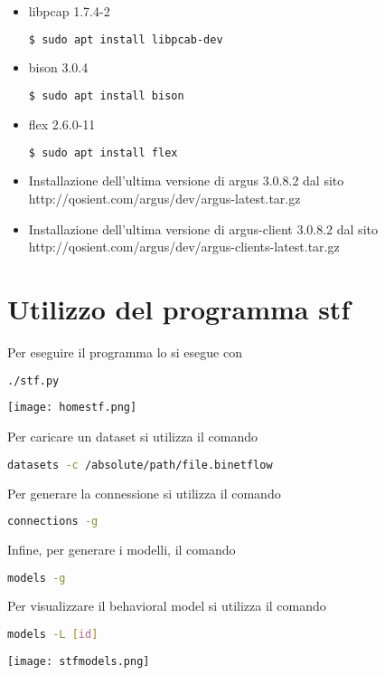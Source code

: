 \documentclass[../main.tex]{subfiles}
\begin{document}
\begin{itemize}
				\item libpcap 1.7.4-2
\begin{lstlisting}[language=bash]
$ sudo apt install libpcab-dev
\end{lstlisting}

\item bison 3.0.4
\begin{lstlisting}[language=bash]
$ sudo apt install bison
\end{lstlisting}

\item flex 2.6.0-11
\begin{lstlisting}[language=bash]
$ sudo apt install flex
\end{lstlisting}

\item Installazione dell'ultima versione di argus 3.0.8.2 dal sito http://qosient.com/argus/dev/argus-latest.tar.gz

\item Installazione dell'ultima versione di argus-client 3.0.8.2 dal sito http://qosient.com/argus/dev/argus-clients-latest.tar.gz

\end{itemize}

\section{Utilizzo del programma stf\\}
Per eseguire il programma lo si esegue con
\begin{lstlisting}[language=bash]
	./stf.py
\end{lstlisting}
\texttt{[image: homestf.png]}

Per caricare un dataset si utilizza il comando
\begin{lstlisting}[language=bash]
	datasets -c /absolute/path/file.binetflow	
\end{lstlisting}

Per generare la connessione si utilizza il comando
\begin{lstlisting}[language=bash]
	connections -g	
\end{lstlisting}

Infine, per generare i modelli, il comando
\begin{lstlisting}[language=bash]
	models -g	
\end{lstlisting}

Per visualizzare il behavioral model si utilizza il comando
\begin{lstlisting}[language=bash]
	models -L [id]	
\end{lstlisting}
\texttt{[image: stfmodels.png]}
\end{document}
